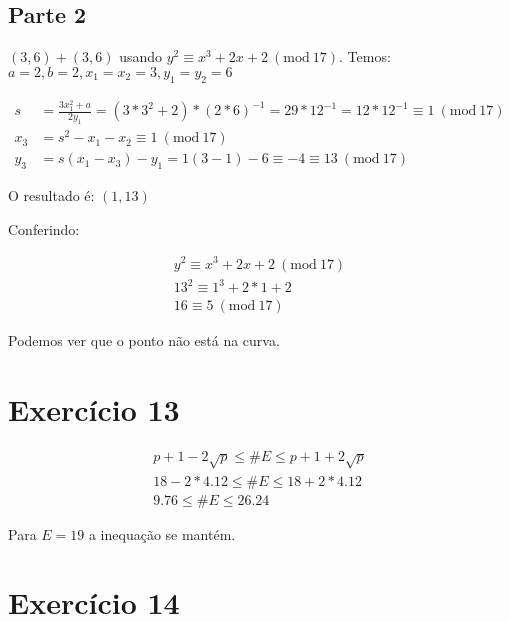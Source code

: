 \documentclass[a4paper]{article}
\newcommand{\Mod}[1]{\ (\mathrm{mod}\ #1)}
\begin{document}
\subsection{Parte 2}
$(3, 6) + (3, 6)$ usando $y^2 \equiv x^3 + 2x + 2 \Mod{17}$. 
\newline
\newline
Temos: $a = 2, b = 2, x_1 = x_2 = 3, y_1 = y_2 = 6$

\begin{equation}
  \begin{align*}
    s &= \frac{3x_1^2 + a}{2y_1} = (3*3^2 + 2) * (2*6)^{-1} = 29*12^{-1} = 12 * 12^{-1} \equiv 1 \Mod{17}\\
    x_3 &= s^2 - x_1 - x_2 \equiv 1 \Mod{17}\\
    y_3 &= s(x_1 - x_3) - y_1 = 1(3 - 1) -6 \equiv -4 \equiv 13 \Mod{17}
  \end{align*}
\end{equation}

O resultado é: $(1, 13)$

Conferindo:

\begin{equation}
  \begin{align*}
    y^2 \equiv x^3 + 2x + 2 \Mod{17}\\
    13^2 \equiv 1^3 + 2*1 + 2 \\
    16 \equiv 5 \Mod{17}
  \end{align*}
\end{equation}

Podemos ver que o ponto não está na curva.

\section{Exercício 13}\label{sec:Ex13}

\begin{equation}
  \begin{align*}
    p+1 - 2\sqrt{p} \leq \# E \leq p + 1 + 2\sqrt{p}\\
    18 - 2*4.12 \leq \# E \leq 18 + 2*4.12\\
    9.76 \leq \# E \leq 26.24
  \end{align*}
\end{equation}

Para $E = 19$ a inequação se mantém.

\section{Exercício 14}\label{sec:Ex14}
\end{document}
